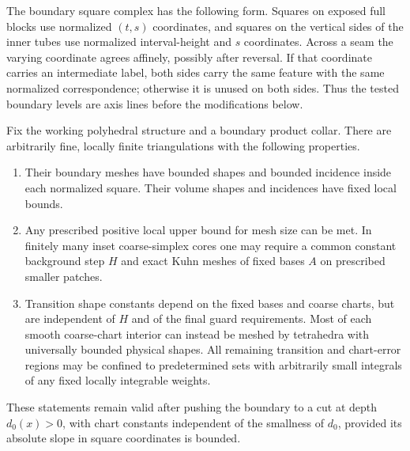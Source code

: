 The boundary square complex has the following form.  Squares on exposed
full blocks use normalized $(t,s)$ coordinates, and squares on the
vertical sides of the inner tubes use normalized interval-height and
$s$ coordinates.  Across a seam the varying coordinate agrees affinely,
possibly after reversal.  If that coordinate carries an intermediate
label, both sides carry the same feature with the same normalized
correspondence; otherwise it is unused on both sides.  Thus the tested
boundary levels are axis lines before the modifications below.

\begin{lemma}
\label{ms:meshes}
Fix the working polyhedral structure and a boundary product collar.
There are arbitrarily fine, locally finite triangulations with the
following properties.
\begin{enumerate}
\item Their boundary meshes have bounded shapes and bounded incidence
inside each normalized square.  Their volume shapes and incidences
have fixed local bounds.
\item Any prescribed positive local upper bound for mesh size can be
met.  In finitely many inset coarse-simplex cores one may require a
common constant background step $H$ and exact Kuhn meshes of fixed
bases $A$ on prescribed smaller patches.
\item Transition shape constants depend on the fixed bases and coarse
charts, but are independent of $H$ and of the final guard requirements.
Most of each smooth coarse-chart interior can instead be meshed by
tetrahedra with universally bounded physical shapes.  All remaining
transition and chart-error regions may be confined to predetermined
sets with arbitrarily small integrals of any fixed locally integrable
weights.
\end{enumerate}
These statements remain valid after pushing the boundary to a cut at
depth $d_0(x)>0$, with chart constants independent of the smallness of
$d_0$, provided its absolute slope in square coordinates is bounded.
\end{lemma}

